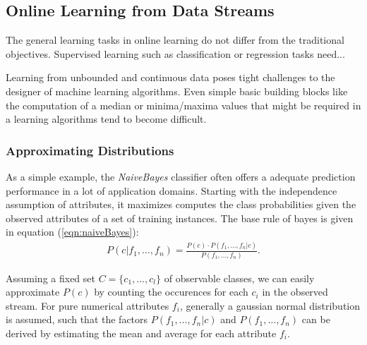 \subsection{\label{sec:onlineLearning}Online Learning from Data Streams}
The general learning tasks in online learning do not differ from the
traditional objectives. Supervised learning such as classification or
regression tasks need...

Learning from unbounded and continuous data poses tight challenges to
the designer of machine learning algorithms. Even simple basic
building blocks like the computation of a median or minima/maxima
values that might be required in a learning algorithms tend to become
difficult.


\subsubsection*{Approximating Distributions}
As a simple example, the {\em NaiveBayes}\cite{NB} classifier often
offers a adequate prediction performance in a lot of application
domains. Starting with the independence assumption of attributes, it
maximizes computes the class probabilities given the observed
attributes of a set of training instances. The base rule of bayes is
given in equation (\ref{eqn:naiveBayes}):
\begin{eqnarray}
  P(c | f_1,\ldots,f_n ) = \frac{P(c)\cdot P(f_1,\ldots,f_n|c)}{P(f_1,\ldots,f_n)}.\label{eqn:naiveBayes}
\end{eqnarray}

Assuming a fixed set $C = \{c_1,\ldots,c_l\}$ of observable classes, we
can easily approximate $P(c)$ by counting the occurences for each
$c_i$ in the observed stream. For pure numerical attributes $f_i$,
generally a gaussian normal distribution is assumed, such that the
factors $P(f_1,\ldots,f_n|c)$ and $P(f_1,\ldots,f_n)$ can be derived
by estimating the mean and average for each attribute $f_i$.


